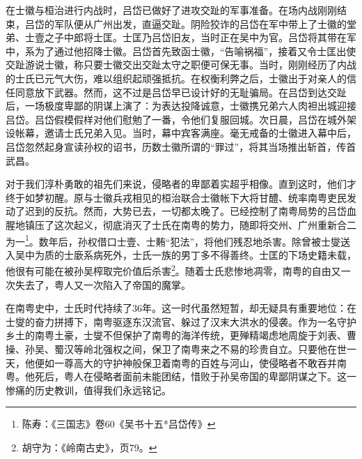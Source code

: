 在士徽与桓治进行内战时，吕岱已做好了进攻交趾的军事准备。在场内战刚刚结束，吕岱的军队便从广州出发，直逼交趾。阴险狡诈的吕岱在军中带上了士徽的堂弟、士壹之子中郎将士匡。士匡乃吕岱旧友，当时正在吴中为官。吕岱将其带在军中，系为了通过他招降士徽。吕岱首先致函士徽，“告喻祸福”，接着又令士匡出使交趾游说士徽，称只要士徽交出交趾太守之职便可保无事。当时，刚刚经历了内战的士氏已元气大伤，难以组织起顽强抵抗。在权衡利弊之后，士徽出于对亲人的信任同意放下武器。然而，这不过是吕岱早已设计好的无耻骗局。在吕岱到达交趾后，一场极度卑鄙的阴谋上演了：为表达投降诚意，士徽携兄弟六人肉袒出城迎接吕岱。吕岱假模假样对他们慰勉了一番，令他们复服回城。次日晨，吕岱在城外架设帐幕，邀请士氏兄弟入见。当时，幕中宾客满座。毫无戒备的士徽进入幕中后，吕岱忽然起身宣读孙权的诏书，历数士徽所谓的“罪过”，将其当场推出斩首，传首武昌。

对于我们淳朴勇敢的祖先们来说，侵略者的卑鄙着实超乎相像。直到这时，他们才终于如梦初醒。原与士徽兵戎相见的桓治联合士徽帐下大将甘醴、统率南粤吏民发动了迟到的反抗。然而，大势已去，一切都太晚了。已经控制了南粤局势的吕岱血腥地镇压了这次起义，彻底消灭了士氏在南粤的势力，随即将交州、广州重新合二为一\footnote{陈寿：《三国志》卷60《吴书十五*吕岱传》}。数年后，孙权借口士壹、士䵋“犯法”，将他们残忍地杀害。除曾被士燮送入吴中为质的士廞系病死外，士氏一族的男丁多不得善终。士匡的下场史籍未载，他很有可能在被孙吴榨取完价值后杀害\footnote{胡守为：《岭南古史》，页79。}。随着士氏悲惨地凋零，南粤的自由又一次失去了，粤人又一次陷入了帝国的魔掌。

在南粤史中，士氏时代持续了36年。这一时代虽然短暂，却无疑具有重要地位：在士燮的奋力拼搏下，南粤驱逐东汉流官、躲过了汉末大洪水的侵袭。作为一名守护乡土的南粤土豪，士燮不但保护了南粤的海洋传统，更殚精竭虑地周旋于刘表、曹操、孙吴、蜀汉等岭北强权之间，保卫了南粤来之不易的珍贵自立。只要他在世一天，他便如一尊高大的守护神般保卫着南粤的百姓与河山，使侵略者不敢吞并南粤。他死后，粤人在侵略者面前未能团结，惜败于孙吴帝国的卑鄙阴谋之下。这一惨痛的历史教训，值得我们永远铭记。


